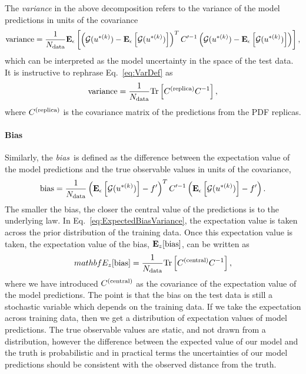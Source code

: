 The {\em variance} in the above decomposition refers to the variance of the
model predictions in units of the covariance
\begin{equation}
    \label{eq:VarDef}
    {\rm variance} = \frac{1}{N_{\rm data}}
    \mathbf{E}_{\epsilon}\left[ 
            \left( \mathcal{G}(u^{* (k)}) - \mathbf{E}_{\epsilon}\left[ \mathcal{G}(u^{* (k)}) \right] \right)^T
            C^{\prime -1}
            \left( \mathcal{G}(u^{* (k)}) - \mathbf{E}_{\epsilon}\left[ \mathcal{G}(u^{* (k)}) \right] \right)
         \right],
\end{equation}
which can be interpreted as the model uncertainty in the space of the
test data. It is instructive to rephrase Eq.~\ref{eq:VarDef} as
\begin{equation}
    \label{eq:VarDefalternative}
    {\rm variance} = \frac{1}{N_{\rm data}} {\rm Tr} \left[ C^{(\rm replica)} C^{-1}_{} \right],
\end{equation}
where $C^{(\rm replica)}$ is the covariance matrix of the predictions
from the PDF replicas.

\paragraph{Bias}

Similarly, the {\em bias}\ is defined as the difference between the expectation
value of the model predictions and the true observable values in
units of the covariance, \ie 
\begin{equation}
    \label{eq:BiasDef}
    {\rm bias} = \frac{1}{N_{\rm data}}
    \left( \mathbf{E}_{\epsilon}\left[ \mathcal{G}(u^{* (k)}) \right] - f^\prime \right)^T
        C^{\prime -1}
    \left( \mathbf{E}_{\epsilon}\left[ \mathcal{G}(u^{* (k)}) \right] - f^\prime \right).
\end{equation}
The smaller the bias, the closer the central value of the predictions is to
the underlying law. In Eq.~\ref{eq:ExpectedBiasVariance}, the expectation
value is taken across the prior distribution of the training data. Once this
expectation value is taken, the expectation value of the bias, $\mathbf{E}_{z}[{\rm bias}]$,
can be written as
\begin{equation}
    mathbf{E}_{z}[{\rm bias}] = \frac{1}{N_{\rm data}}
    {\rm Tr} \left[ C^{(\rm central)} C^{-1}_{} \right],
\end{equation}
where we have introduced $C^{(\rm central)}$ as the covariance of the expectation value
of the model predictions. The point is that the bias on the test data is still
a stochastic variable which depends on the training data. If we take the
expectation across training data, then we get a distribution of expectation
values of model predictions. The true observable values are static, and not
drawn from a distribution, however the difference between the expected value of
our model and the truth is probabilistic and in practical terms the uncertainties
of our model predictions should be consistent with the observed distance
from the truth.

